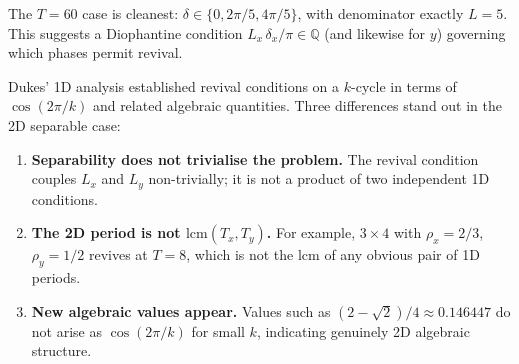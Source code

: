 \noindent The $T=60$ case is cleanest:
$\delta \in \{0, 2\pi/5, 4\pi/5\}$, with denominator exactly $L=5$.
This suggests a Diophantine condition $L_x\,\delta_x/\pi \in
\mathbb{Q}$ (and likewise for $y$) governing which phases permit
revival.

Dukes' 1D analysis established revival conditions on a $k$-cycle in
terms of $\cos(2\pi/k)$ and related algebraic quantities. Three
differences stand out in the 2D separable case:

\begin{enumerate}[nosep]
\item \textbf{Separability does not trivialise the problem.} The
revival condition couples $L_x$ and $L_y$ non-trivially; it is not a
product of two independent 1D conditions.

\item \textbf{The 2D period is not $\mathrm{lcm}(T_x,T_y)$.} For
example, $3\times4$ with $\rho_x=2/3$, $\rho_y=1/2$ revives at $T=8$,
which is not the lcm of any obvious pair of 1D periods.

\item \textbf{New algebraic values appear.} Values such as
$(2-\sqrt2)/4 \approx 0.146447$ do not arise as $\cos(2\pi/k)$ for
small $k$, indicating genuinely 2D algebraic structure.
\end{enumerate}
